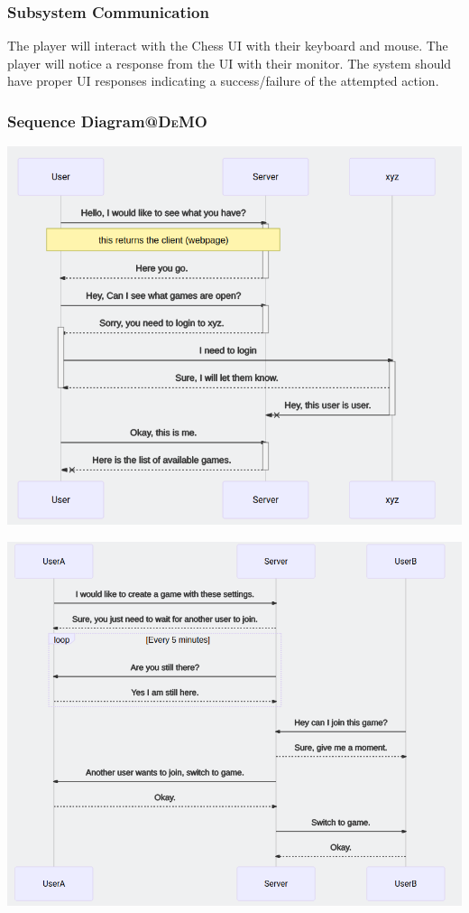 \documentclass[11pt]{article}
\begin{document}
\subsubsection{Subsystem Communication}
\label{sec:org69dbfdd}
The player will interact with the Chess UI with their keyboard and
mouse. The player will notice a response from the UI with their
monitor. The system should have proper UI responses indicating a
success/failure of the attempted action.
\subsubsection{Sequence Diagram\hfill{}\textsc{@DeMO}}
\label{sec:org4c77b70}
\begin{center}
\includegraphics[width=.9\linewidth]{present/Sequence1.png}
\end{center}
\begin{center}
\includegraphics[width=.9\linewidth]{present/Sequence2.png}
\end{center}
\end{document}
